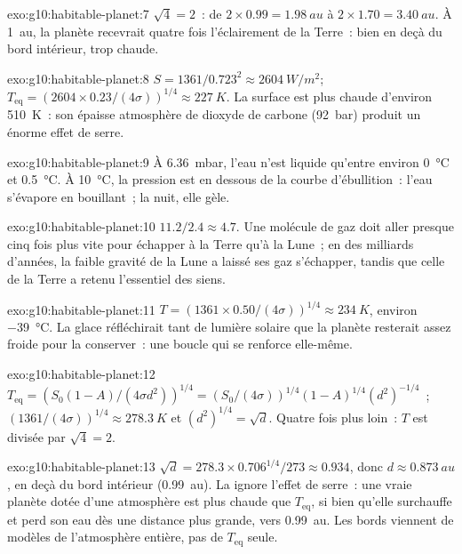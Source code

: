 \begin{solution}{exo:g10:habitable-planet:7}
$\sqrt 4 = 2$~: de $2 \times 0.99 = \qty{1.98}{au}$ à $2 \times 1.70 =
\qty{3.40}{au}$. À \qty{1}{au}, la planète recevrait quatre fois
l'éclairement de la Terre~: bien en deçà du bord intérieur, trop chaude.
\end{solution}

\begin{solution}{exo:g10:habitable-planet:8}
$S = 1361/0.723^2 \approx \qty{2604}{W/m^2}$;
$T_{\mathrm{eq}} = (2604 \times 0.23/(4\sigma))^{1/4} \approx \qty{227}{K}$.
La surface est plus chaude d'environ \qty{510}{K}~: son épaisse atmosphère
de dioxyde de carbone (\qty{92}{bar}) produit un énorme effet de serre.
\end{solution}

\begin{solution}{exo:g10:habitable-planet:9}
À \qty{6.36}{mbar}, l'eau n'est liquide qu'entre environ
\qty{0}{\degreeCelsius} et \qty{0.5}{\degreeCelsius}. À
\qty{10}{\degreeCelsius}, la pression est en dessous de la courbe
d'ébullition~: l'eau s'évapore en bouillant~; la nuit, elle gèle.
\end{solution}

\begin{solution}{exo:g10:habitable-planet:10}
$11.2/2.4 \approx 4.7$. Une molécule de gaz doit aller presque cinq fois plus
vite pour échapper à la Terre qu'à la Lune~; en des milliards d'années, la
faible gravité de la Lune a laissé ses gaz s'échapper, tandis que celle de
la Terre a retenu l'essentiel des siens.
\end{solution}

\begin{solution}{exo:g10:habitable-planet:11}
$T = (1361 \times 0.50/(4\sigma))^{1/4} \approx \qty{234}{K}$, environ
\qty{-39}{\degreeCelsius}. La glace réfléchirait tant de lumière solaire que
la planète resterait assez froide pour la conserver~: une boucle qui se
renforce elle-même.
\end{solution}

\begin{solution}{exo:g10:habitable-planet:12}
$T_{\mathrm{eq}} = (S_0(1-A)/(4\sigma d^2))^{1/4} = (S_0/(4\sigma))^{1/4}
(1-A)^{1/4} (d^2)^{-1/4}$~; $(1361/(4\sigma))^{1/4} \approx \qty{278.3}{K}$ et
$(d^2)^{1/4} = \sqrt d$. Quatre fois plus loin~: $T$ est divisée par
$\sqrt 4 = 2$.
\end{solution}

\begin{solution}{exo:g10:habitable-planet:13}
$\sqrt d = 278.3 \times 0.706^{1/4}/273 \approx 0.934$, donc $d \approx
\qty{0.873}{au}$, en deçà du bord intérieur (\qty{0.99}{au}). La  ignore l'effet de serre~: une vraie planète dotée d'une
atmosphère est plus chaude que $T_{\mathrm{eq}}$, si bien qu'elle surchauffe
et perd son eau dès une distance plus grande, vers \qty{0.99}{au}. Les bords
viennent de modèles de l'atmosphère entière, pas de $T_{\mathrm{eq}}$ seule.
\end{solution}

